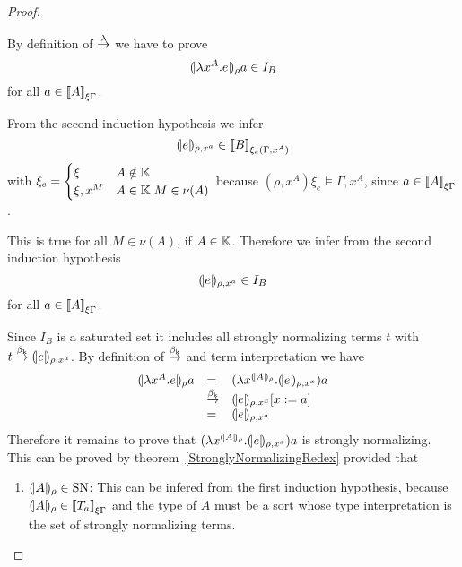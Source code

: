 \begin{theorem}
\begin{proof}
\begin{enumerate}
            By definition of $\stackrel{\lambda}{\to}$ we have to prove
            $$
            {(\!|\lambda x^A.e|\!)_{\rho}} a \in I_B
            $$
            for all $a \in {{{[\![}A {]\!]}}_{\xi\Gamma}}$.

            From the second induction hypothesis we infer
            $$
            {(\!|e|\!)_{\rho,x^a}} \in {{{[\![}B {]\!]}}_{\xi_e(\Gamma,x^A)}}
            $$
            with
            $\xi_e =
            \begin{cases}
                \xi & A \notin \mathbb{K}
                \\
                \xi,x^M & A \in \mathbb{K} \; M \in \nu(A)
            \end{cases}
            $ because $(\rho,x^A)\xi_e \vDash \Gamma, x^A$, since $a \in
            {{{[\![}A {]\!]}}_{\xi\Gamma}}$.

            This is true for all $M \in \nu(A)$, if $A \in \mathbb{K}$. Therefore we
            infer from the second induction hypothesis
            $$
            {(\!|e|\!)_{\rho,x^a}} \in I_B
            $$
            for all $a \in {{{[\![}A {]\!]}}_{\xi\Gamma}}$.

            Since $I_B$ is a saturated set it includes all strongly normalizing
            terms $t$ with $t \stackrel{\beta_{\text{k}}}{\to} {(\!|e|\!)_{\rho,x^a}}$. By definition
            of $\stackrel{\beta_{\text{k}}}{\to}$ and term interpretation we have
            $$
            \begin{array}{lll}
                \terminter{\lambda x^A. e}{\rho} a
                &=&
                (\lambda x^{\terminter{A}{\rho}}. \terminter{e}{\rho,x^x}) a
                \\
                &\keyreduce&
                \terminter{e}{\rho,x^x} [x:=a]
                \\
                &=&
                \terminter{e}{\rho,x^a}
            \end{array}
            $$
            Therefore it remains to prove that $(\lambda
            x^{{(\!|A|\!)_{\rho}}}. {(\!|e|\!)_{\rho,x^x}}) a$ is strongly
            normalizing. This can be proved by
            theorem~\ref{StronglyNormalizingRedex} provided that
            \begin{enumerate}
            \item ${(\!|A|\!)_{\rho}} \in \text{SN}$: This can be infered from the
                first induction hypothesis, because ${(\!|A|\!)_{\rho}} \in
                {{{[\![}T_a {]\!]}}_{\xi\Gamma}}$ and the type of $A$ must be a
                sort whose type interpretation is the set of strongly
                normalizing terms.


\end{enumerate}
\end{enumerate}
\end{proof}
\end{theorem}
